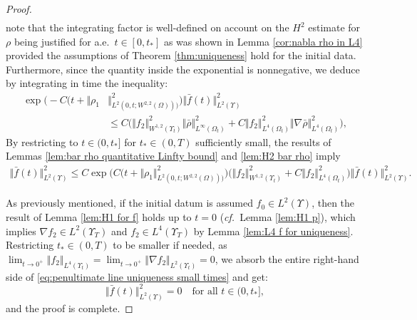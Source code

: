 \documentclass[11pt,a4paper,reqno]{amsart}
\theoremstyle{remark}
\theoremstyle{definition}
\numberwithin{equation}{section}
\begin{document}
\begin{proof}
\begin{equation*}
\begin{aligned}
    \end{aligned}
\end{equation*}
note that the integrating factor is well-defined on account on the $H^2$ estimate for $\rho$ being justified for a.e.~$t \in [0,t_*]$ as was shown in Lemma \ref{cor:nabla rho in L4} provided the assumptions of Theorem \ref{thm:uniqueness} hold for the initial data. Furthermore, since the quantity inside the exponential is nonnegative, we deduce by integrating in time the inequality: 
\begin{equation*}
    \begin{aligned}
        \exp\big(-C(t\!+\!\Vert \rho_1 & \Vert^2_{L^2(0,t;W^{2,2}(\Omega)))} \big)\Vert\bar{f}(t)\Vert_{L^2(\Upsilon)}^2 \\ 
        &\leq C \Big(  \Vert f_2 \Vert_{W^{1,2}(\Upsilon_t)}^2 \Vert \bar{\rho} \Vert_{L^\infty(\Omega_t)}^2  \!+\! C\Vert f_2 \Vert_{L^4(\Omega_t)}^2 \Vert \nabla\bar{\rho} \Vert_{L^4(\Omega_t)}^2 \Big), 
    \end{aligned}
\end{equation*}
By restricting to $t \in (0,t_*]$ for $t_* \in (0,T)$ sufficiently small, the results of Lemmas \ref{lem:bar rho quantitative Linfty bound} and \ref{lem:H2 bar rho} imply 
\begin{equation}\label{eq:penultimate line uniqueness small times}
    \begin{aligned}
       \Vert\bar{f}(t)\Vert_{L^2(\Upsilon)}^2 \leq C  \exp\big(C(t\!+\!\Vert \rho_1 \Vert^2_{L^2(0,t;W^{2,2}(\Omega)))} \big) \Big(  \Vert f_2 \Vert_{W^{1,2}(\Upsilon_t)}^2  \!+\! C\Vert f_2 \Vert_{L^4(\Omega_t)}^2  \Big)\Vert\bar{f}(t)\Vert_{L^2(\Upsilon)}^2. 
    \end{aligned}
\end{equation}


As previously mentioned, if the initial datum is assumed $f_0 \in L^2(\Upsilon)$, then the result of Lemma \ref{lem:H1 for f} holds up to $t=0$ (\textit{cf.}~Lemma \ref{lem:H1 p}), which implies $\nabla f_2 \in L^2(\Upsilon_T)$ and $f_2 \in L^4(\Upsilon_T)$ by Lemma \ref{lem:L4 f for uniqueness}. Restricting $t_* \in (0,T)$ to be smaller if needed, as $\lim_{t\to 0^+}\Vert f_2 \Vert_{L^4(\Upsilon_t)} = \lim_{t\to 0^+}\Vert \nabla f_2 \Vert_{L^2(\Upsilon_t)}=0$, we absorb the entire right-hand side of \eqref{eq:penultimate line uniqueness small times} and get: $$\Vert\bar{f}(t)\Vert_{L^2(\Upsilon)}^2  = 0\quad\text{for all } t \in (0,t_*],$$
and the proof is complete. 
\end{proof}
\end{document}
